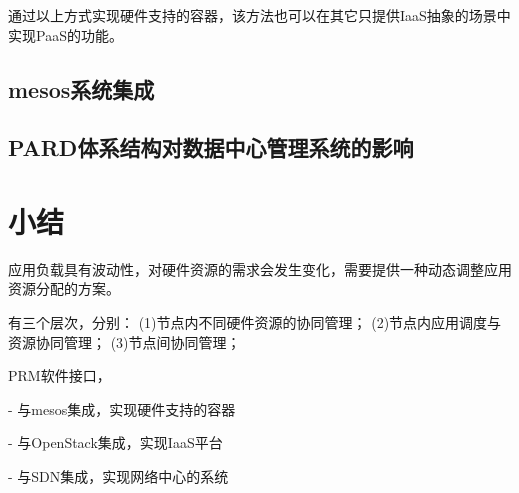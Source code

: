 通过以上方式实现硬件支持的容器，该方法也可以在其它只提供IaaS抽象的场景中实现PaaS的功能。

\subsection{mesos系统集成}



\subsection{PARD体系结构对数据中心管理系统的影响}

\section{小结}


应用负载具有波动性，对硬件资源的需求会发生变化，需要提供一种动态调整应用资源分配的方案。

有三个层次，分别：
(1)节点内不同硬件资源的协同管理；
(2)节点内应用调度与资源协同管理；
(3)节点间协同管理；


PRM软件接口，

- 与mesos集成，实现硬件支持的容器

- 与OpenStack集成，实现IaaS平台

- 与SDN集成，实现网络中心的系统

